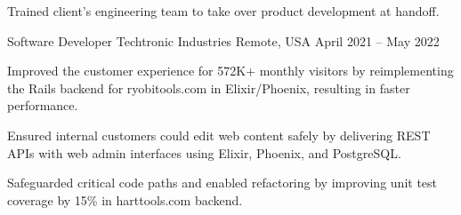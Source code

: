 \begin{cventries}
{\begin{cvitems}
			\item Trained client's engineering team to take over product development
			at handoff.
		\end{cvitems}
	}

	\cventry
	{Software Developer} %
	{Techtronic Industries} %
	{Remote, USA} %
	{April 2021 -- May 2022} %
	{
		\begin{cvitems}
			\item Improved the customer experience for 572K+ monthly visitors by
			reimplementing the Rails backend for ryobitools.com in Elixir/Phoenix,
			resulting in faster performance.
			\item Ensured internal customers could edit web content safely by
			delivering REST APIs with web admin interfaces using Elixir, Phoenix,
			and PostgreSQL.
			\item Safeguarded critical code paths and enabled refactoring by improving
			unit test coverage by 15\% in harttools.com backend.
		\end{cvitems}
	}



\end{cventries}
